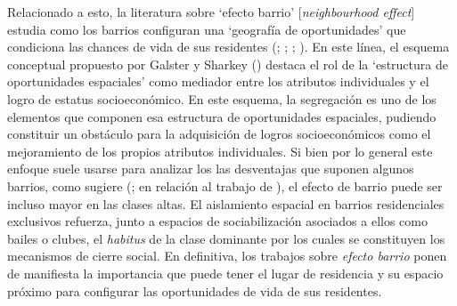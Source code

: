 \documentclass[
  spanish,
  a4paper,%
  chapterprefix=true,%
  DIV=calc,%
  twoside]{scrbook}%
\begin{document}
Relacionado a esto, la literatura sobre `efecto barrio' {[}\emph{neighbourhood
effect}{]} estudia como los barrios configuran una `geografía de
oportunidades' que condiciona las chances de vida de sus residentes
(; ; ; ). En este
línea, el esquema conceptual propuesto por Galster y Sharkey () destaca el rol
de la `estructura de oportunidades espaciales' como mediador entre los
atributos individuales y el logro de estatus socioeconómico. En este
esquema, la segregación es uno de los elementos que componen esa
estructura de oportunidades espaciales, pudiendo constituir un obstáculo
para la adquisición de logros socioeconómicos como el mejoramiento de
los propios atributos individuales. Si bien por lo general este enfoque
suele usarse para analizar los las desventajas que suponen algunos
barrios, como sugiere (; en relación al trabajo de ), el efecto de barrio puede ser incluso mayor en las
clases altas. El aislamiento espacial en barrios residenciales
exclusivos refuerza, junto a espacios de sociabilización asociados a
ellos como bailes o clubes, el \emph{habitus} de la clase dominante por los
cuales se constituyen los mecanismos de cierre social. En definitiva,
los trabajos sobre \emph{efecto barrio} ponen de manifiesta la importancia
que puede tener el lugar de residencia y su espacio próximo para
configurar las oportunidades de vida de sus
residentes.
\end{document}
